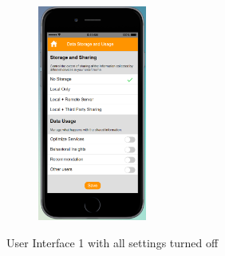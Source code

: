 \begin{figure}
\begin{subfigure}[t]{0.24\textwidth}
	\end{subfigure}%
	~
	\begin{subfigure}[t]{0.24\textwidth}
		\centering
		\includegraphics[height=2.8in]{figures/ui1allOff4.png}
	\end{subfigure}%
	\caption{User Interface 1 with all settings turned off}
	\label{fig:ui1AllOff}
\end{figure}

